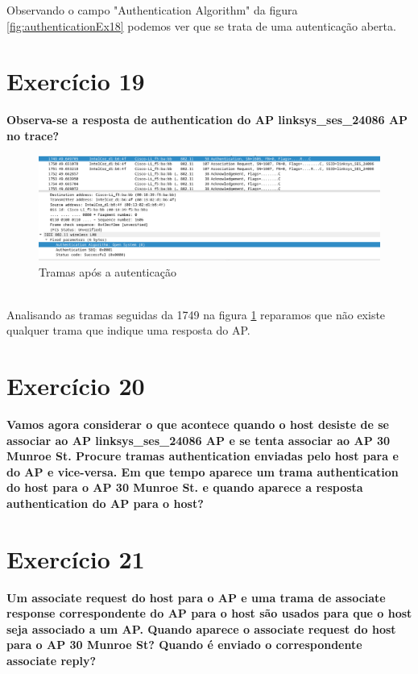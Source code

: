 \documentclass[a4paper]{report}
\begin{document}
Observando o campo "Authentication Algorithm" da figura \ref{fig:authenticationEx18}
podemos ver que se trata de uma autenticação aberta.

\section{Exercício 19}
\textbf{Observa-se a resposta de authentication do AP linksys\_ses\_24086 AP no
    trace?}\\

\begin{figure}[H]
    \centering 
    \includegraphics[width=\textwidth]{images/tramasEx19.png}  
    \caption{Tramas após a autenticação}
    \label{fig:tramasEx19}
\end{figure}\\

Analisando as tramas seguidas da 1749 na figura \ref{fig:tramasEx19} reparamos 
que não existe qualquer trama que indique uma resposta do AP.

\section{Exercício 20}
\textbf{Vamos agora considerar o que acontece quando o host desiste de se
    associar ao AP linksys\_ses\_24086 AP e se tenta associar ao AP 30 Munroe
    St. Procure tramas authentication enviadas pelo host para e do AP e
    vice-versa. Em que tempo aparece um trama authentication do host para o AP
    30 Munroe St. e quando aparece a resposta authentication do AP para o
    host?}\\

\section{Exercício 21}
\textbf{Um associate request do host para o AP e uma trama de associate response
    correspondente do AP para o host são usados para que o host seja associado a
    um AP. Quando aparece o associate request do host para o AP 30 Munroe St?
    Quando é enviado o correspondente associate reply?}\\
\end{document}
